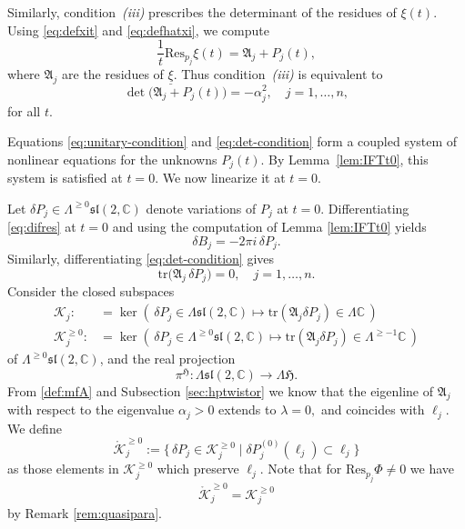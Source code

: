 \documentclass[12pt,a4paper]{amsart}
\theoremstyle{definition}
\theoremstyle{remark}
\newcommand{\C}{\mathbb C}
\newcommand{\tr}{\mathrm{tr}}
\newcommand{\Res}{\mathrm{Res}}
\begin{document}
Similarly, condition~\emph{(iii)} prescribes the determinant of the residues of $\xi(t)$.
Using \eqref{eq:defxit} and \eqref{eq:defhatxi}, we compute
\[
\frac{1}{t}\Res_{p_j}\xi(t)
=
\mathfrak A_j + P_j(t),
\]
where $\mathfrak A_j$ are the residues of $\underline\xi$.
Thus condition~\emph{(iii)} is equivalent to
\begin{equation}\label{eq:det-condition}
\det\bigl(\mathfrak A_j + P_j(t)\bigr) = -\alpha_j^2,
\quad j=1,\dots,n,
\end{equation}
for all $t$.






Equations \eqref{eq:unitary-condition} and \eqref{eq:det-condition} form a coupled
system of nonlinear equations for the unknowns $P_j(t)$.
By Lemma~\ref{lem:IFTt0}, this system is satisfied at $t=0$.
We now linearize it at $t=0$.

Let $\delta P_j\in \Lambda^{\geq 0}\mathfrak{sl}(2,\C)$ denote variations of $P_j$ at $t=0$.
Differentiating \eqref{eq:difres} at $t=0$ and using the computation of Lemma \ref{lem:IFTt0} yields
\[
\delta B_j = -2\pi i\,\delta P_j .
\]
Similarly, differentiating \eqref{eq:det-condition} gives
\begin{equation}\label{eq:linear-det}
\tr\bigl(\mathfrak A_j\,\delta P_j\bigr)=0,
\quad j=1,\dots,n.
\end{equation}
Consider the closed subspaces  
\begin{equation*}\begin{split}
\mathcal K_{j}:&=\ker\left(\,\delta P_j\in \Lambda\mathfrak{sl}(2,\C)\mapsto 
\tr(\mathfrak A_j \delta P_j)\in\Lambda \C \,\right)\\
\mathcal K^{\geq0}_{j}:&=\ker\left(\,\delta P_j\in \Lambda^{\geq 0}\mathfrak{sl}(2,\C)\mapsto 
\tr(\mathfrak A_j \delta P_j)\in\Lambda^{\geq-1}\C \,\right)\end{split}\end{equation*}
of $\Lambda^{\geq 0}\mathfrak{sl}(2,\C)$, and
the real projection
\[\pi^{\mathfrak{H}}\colon  \Lambda\mathfrak{sl}(2,\C)\to \Lambda\mathfrak H.\]
From \eqref{def:mfA} and Subsection \ref{sec:hptwistor} we know that the eigenline of $\mathfrak A_j$ with respect
to the eigenvalue $\alpha_j>0$ extends to $\lambda=0,$ and coincides with $\ell_j.$ We define
\[\mathring {\mathcal K}^{\geq0}_{j}:=\{\,\delta P_j\in\mathcal K^{\geq0}_{j}\mid \delta P_j^{(0)}(\ell_j)\subset\ell_j\}\]
as those elements in $\mathcal K^{\geq0}_{j}$ which preserve $\ell_j.$ Note that for
$\Res_{p_j}\Phi\neq0$ we have
\[\mathring {\mathcal K}^{\geq0}_{j}={\mathcal K}^{\geq0}_{j}\]
by Remark  \ref{rem:quasipara}.
\end{document}
